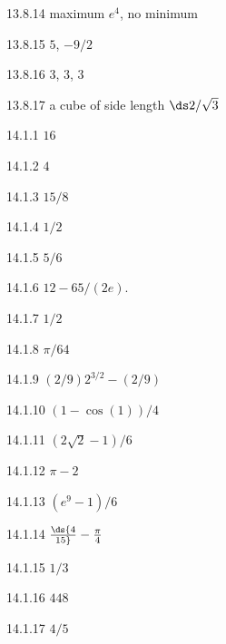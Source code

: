 \begin{Answer}{13.8.14}
maximum $e^4$, no minimum
\end{Answer}
\begin{Answer}{13.8.15}
$5$, $-9/2$
\end{Answer}
\begin{Answer}{13.8.16}
$3$, $3$, $3$
\end{Answer}
\begin{Answer}{13.8.17}
a cube of side length $\ds 2/\sqrt{3}$
\end{Answer}
\begin{Answer}{14.1.1}
$16$
\end{Answer}
\begin{Answer}{14.1.2}
$4$
\end{Answer}
\begin{Answer}{14.1.3}
$15/8$
\end{Answer}
\begin{Answer}{14.1.4}
$1/2$
\end{Answer}
\begin{Answer}{14.1.5}
$5/6$
\end{Answer}
\begin{Answer}{14.1.6}
$12-65/(2e)$.
\end{Answer}
\begin{Answer}{14.1.7}
$1/2$
\end{Answer}
\begin{Answer}{14.1.8}
$\pi/64$
\end{Answer}
\begin{Answer}{14.1.9}
$(2/9)2^{3/2}-(2/9)$
\end{Answer}
\begin{Answer}{14.1.10}
$(1-\cos(1))/4$
\end{Answer}
\begin{Answer}{14.1.11}
$(2\sqrt2-1)/6$
\end{Answer}
\begin{Answer}{14.1.12}
$\pi-2$
\end{Answer}
\begin{Answer}{14.1.13}
$(e^9-1)/6$
\end{Answer}
\begin{Answer}{14.1.14}
$\ds {4\over15}-{\pi\over4}$
\end{Answer}
\begin{Answer}{14.1.15}
$1/3$
\end{Answer}
\begin{Answer}{14.1.16}
$448$
\end{Answer}
\begin{Answer}{14.1.17}
$4/5$
\end{Answer}
